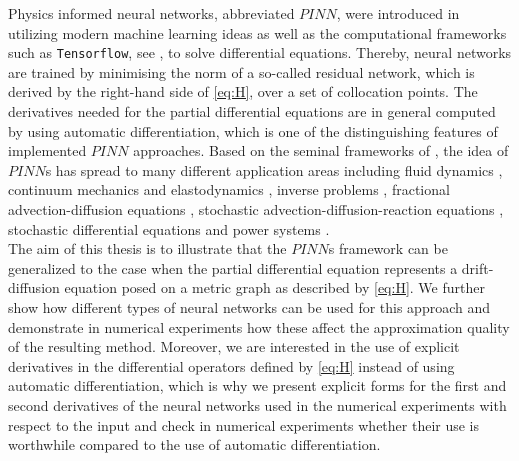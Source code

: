 Physics informed neural networks, abbreviated $PINN$, were introduced in \cite{RaissiPerdikarisKarniadakisPart1:2017} utilizing modern machine learning ideas as well as the computational frameworks such as \lstinline!Tensorflow!, see \cite{TensorFlow}, to solve differential equations. Thereby, neural networks are trained by minimising the norm of a so-called residual network, which is derived by the right-hand side of \cref{eq:H}, over a set of collocation points. The derivatives needed for the partial differential equations are in general computed by using automatic differentiation, which is one of the distinguishing features of implemented $PINN$ approaches. Based on the seminal frameworks of \cite{RaissiPerdikarisKarniadakis:2019,lu2021deepxde}, the idea of $PINN$s has spread to many different application areas \cite{zhu2019physics,mao2020physics,jin2021nsfnets,sahli2020physics} including fluid dynamics \cite{raissi2018hidden,MAO2020112789,lye2020deep,magiera2020constraint,wessels2020neural}, continuum mechanics and elastodynamics \cite{haghighat2020deep,nguyen2020deep,rao2020physics}, inverse problems \cite{meng2020composite,jagtap2020conservative}, fractional advection-diffusion equations \cite{pang2019fpinns}, stochastic advection-diffusion-reaction equations \cite{chen2019learning}, stochastic differential equations \cite{yang2020physics} and power systems \cite{misyris2020physics}. \\
The aim of this thesis is to illustrate that the $PINN$s framework can be generalized to the case when the partial differential equation represents a drift-diffusion equation posed on a metric graph as described by \cref{eq:H}. We further show how different types of neural networks can be used for this approach and demonstrate in numerical experiments how these affect the approximation quality of the resulting method. Moreover, we are interested in the use of explicit derivatives in the differential operators defined by \cref{eq:H} instead of using automatic differentiation, which is why we present explicit forms for the first and second derivatives of the neural networks used in the numerical experiments with respect to the input and check in numerical experiments whether their use is worthwhile compared to the use of automatic differentiation. \\
